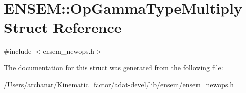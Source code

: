\hypertarget{structENSEM_1_1OpGammaTypeMultiply}{}\section{E\+N\+S\+EM\+:\+:Op\+Gamma\+Type\+Multiply Struct Reference}
\label{structENSEM_1_1OpGammaTypeMultiply}


{\ttfamily \#include $<$ensem\+\_\+newops.\+h$>$}



The documentation for this struct was generated from the following file\+:\begin{DoxyCompactItemize}
\item 
/\+Users/archanar/\+Kinematic\+\_\+factor/adat-\/devel/lib/ensem/\mbox{\hyperlink{adat-devel_2lib_2ensem_2ensem__newops_8h}{ensem\+\_\+newops.\+h}}\end{DoxyCompactItemize}
